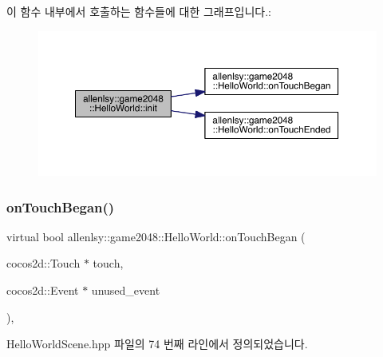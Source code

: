 이 함수 내부에서 호출하는 함수들에 대한 그래프입니다.\+:
\nopagebreak
\begin{figure}[H]
\begin{center}
\leavevmode
\includegraphics[width=350pt]{d5/d2b/classallenlsy_1_1game2048_1_1_hello_world_a129b861a8239d9cf2030b1b59e204a46_cgraph}
\end{center}
\end{figure}
\mbox{\label{classallenlsy_1_1game2048_1_1_hello_world_a0cc62fe1173f141d60833be4804f97d9}} 
\subsubsection{\texorpdfstring{on\+Touch\+Began()}{onTouchBegan()}}
{\footnotesize\ttfamily virtual bool allenlsy\+::game2048\+::\+Hello\+World\+::on\+Touch\+Began (\begin{DoxyParamCaption}\item[{cocos2d\+::\+Touch $\ast$}]{touch,  }\item[{cocos2d\+::\+Event $\ast$}]{unused\+\_\+event }\end{DoxyParamCaption})\hspace{0.3cm}{\ttfamily [inline]}, {\ttfamily [virtual]}}



Hello\+World\+Scene.\+hpp 파일의 74 번째 라인에서 정의되었습니다.


